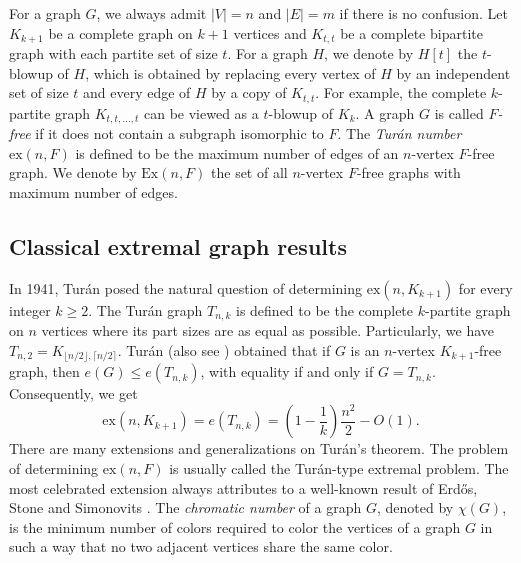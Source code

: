 \documentclass[11pt,a4paper]{article}
\theoremstyle{plain}
\theoremstyle{definition}
\begin{document}
 For a graph $G$, we always admit 
$|V|=n$ and $|E|=m$ if there is no confusion. 
Let $K_{k+1}$ be a complete graph on $k+1$ vertices and $K_{t,t}$ be a complete bipartite graph with each partite set of size $t$. 
For a graph $H$, we denote by $H[t]$ the $t$-blowup of $H$, which is obtained by replacing every vertex of $H$ by an independent set of size $t$ and every edge of $H$ by a copy of $K_{t,t}$. 
For example, the complete $k$-partite graph $K_{t,t,\ldots ,t}$ can be viewed as a $t$-blowup of $K_k$. 
 A graph $G$ is called {\it $F$-free} if it  does not contain a subgraph isomorphic to $F$. 
 The {\it Tur\'an number} $\mathrm{ex}(n, {F})$ is defined to be the maximum number of edges of {an $n$-vertex $F$-free graph.}  
We denote by $\mathrm{Ex}(n,{F})$ the set of all $n$-vertex $F$-free graphs with maximum number of edges. 




\subsection{Classical extremal graph results}

 In 1941, Tur\'{a}n \cite{Turan41} posed the  natural question of determining 
 $\mathrm{ex}(n,K_{k+1})$ for every integer $k\ge 2$. 
The Tur\'{a}n graph $T_{n,k}$ is defined to be the complete $k$-partite graph on $n$ vertices where 
 its part sizes are as equal as possible. 
 Particularly, we have $T_{n,2}=K_{\lfloor n/2\rfloor, \lceil n/2\rceil}$. 
Tur\'{a}n \cite{Turan41} 
(also see \cite[p. 294]{Bollobas78}) obtained that if $G$ is an $n$-vertex $K_{k+1}$-free graph, 
then $e(G)\le e(T_{n,k})$, with equality if and only if $G=T_{n,k}$. Consequently, we get 
\begin{equation}
    \label{eq-Turan}
    \mathrm{ex}(n,K_{k+1})= e(T_{n,k})=  
\left(1- \frac{1}{k} \right) 
\frac{n^2}{2} - O(1).
\end{equation}   
There are many extensions and generalizations on Tur\'{a}n's theorem.  
The problem of determining $\mathrm{ex}(n, F)$ is usually called the 
Tur\'{a}n-type extremal problem. 
 The most celebrated extension always attributes to a well-known result of Erd\H{o}s, Stone and Simonovits \cite{ES1946,ES1966}. 
 The {\it chromatic number} of a graph $G$, denoted by $\chi(G)$, is the minimum number of colors required to color the vertices of a graph $G$ in such a way that no two adjacent vertices share the same color. 
\end{document}
